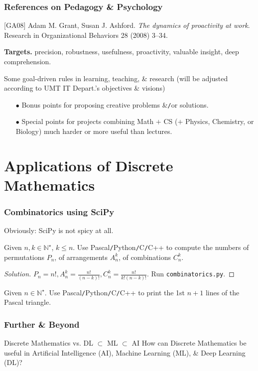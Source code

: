 \documentclass{beamer}
\begin{document}
\begin{frame}
	\frametitle{References on Pedagogy \& Psychology}
	[GA08] {\sc Adam M. Grant, Susan J. Ashford}. {\it The dynamics of proactivity at work}. Research in Organizational Behaviors 28 (2008) 3--34.
	\vspace{5mm}
	
	{\bf Targets.} precision, robustness, usefulness, proactivity, valuable insight, deep comprehension.
	\begin{block}{Some goal-driven rules in learning, teaching, \& research}
		(will be adjusted according to UMT IT Depart.'s objectives \& visions)
		\begin{itemize}
			\item[$\bullet$] Bonus points for proposing creative problems \&{\tt/}or solutions.
			\item[$\bullet$] Special points for projects combining Math $+$ CS ($+$ Physics, Chemistry, or Biology) much harder or more useful than lectures.
		\end{itemize}
	\end{block}
\end{frame}

\section{Applications of Discrete Mathematics}

\begin{frame}
	\frametitle{Combinatorics using SciPy}
	Obviously: SciPy is not spicy at all.
	\begin{problem}
		Given $n,k\in\mathbb{N}^\star$, $k\le n$. Use {\sf Pascal{\tt/}Python{\tt/}C{\tt/}C++} to compute the numbers of permutations $P_n$, of arrangements $A_n^k$, of combinations $C_n^k$.
	\end{problem}
	
	\begin{proof}[Solution]
		$P_n = n!,A_n^k = \frac{n!}{(n - k)!},C_n^k = \frac{n!}{k!(n - k)!}$. Run {\tt combinatorics.py}.		
	\end{proof}
	
	\begin{problem}
		Given $n\in\mathbb{N}^\star$. Use {\sf Pascal{\tt/}Python{\tt/}C{\tt/}C++} to print the 1st $n + 1$ lines of the Pascal triangle.
	\end{problem}
\end{frame}

\begin{frame}
	\frametitle{Further \& Beyond}
	\begin{block}{Discrete Mathematics vs. DL $\subset$ ML $\subset$ AI}
		How can Discrete Mathematics be useful in Artificial Intelligence (AI), Machine Learning (ML), \& Deep Learning (DL)?
	\end{block}
	
\end{frame}
\end{document}
